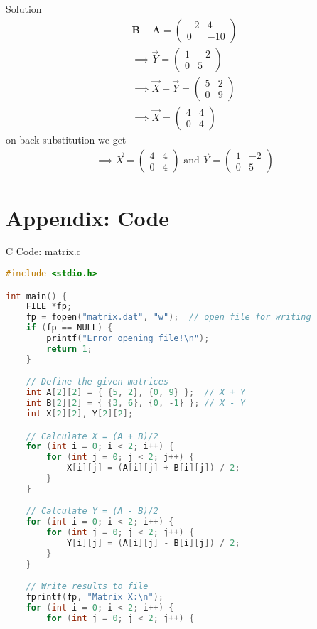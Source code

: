 \documentclass{beamer}
\numberwithin{equation}{section}
\theoremstyle{remark}
\let\vec\mathbf
\begin{document}
\begin{frame}{Solution}
    \begin{align}
\vec{B-A}= \begin{pmatrix}
    -2 & 4\\
    0 & -10
\end{pmatrix}\\
\implies \Vec{Y}=\begin{pmatrix} 1 & -2 \\ 0 & 5 \end{pmatrix}\\
\implies \Vec{X}+\Vec{Y}=\begin{pmatrix} 5 & 2 \\ 0 & 9 \end{pmatrix}\\
\implies \Vec{X}=\begin{pmatrix} 4 & 4 \\ 0 & 4 \end{pmatrix}
\end{align}
on back substitution we get
    \begin{align}
    \implies \Vec{X}=\begin{pmatrix}
    4 & 4\\
    0 & 4
\end{pmatrix} \text{ and } \Vec{Y}=\begin{pmatrix}
    1 & -2\\
    0 & 5
\end{pmatrix}
\end{align}
\end{frame}

\section*{Appendix: Code}

\begin{frame}[fragile]{C Code: matrix.c}
\begin{lstlisting}[language=C]
#include <stdio.h>

int main() {
    FILE *fp;
    fp = fopen("matrix.dat", "w");  // open file for writing
    if (fp == NULL) {
        printf("Error opening file!\n");
        return 1;
    }

    // Define the given matrices
    int A[2][2] = { {5, 2}, {0, 9} };  // X + Y
    int B[2][2] = { {3, 6}, {0, -1} }; // X - Y
    int X[2][2], Y[2][2];

    // Calculate X = (A + B)/2
    for (int i = 0; i < 2; i++) {
        for (int j = 0; j < 2; j++) {
            X[i][j] = (A[i][j] + B[i][j]) / 2;
        }
    }

    // Calculate Y = (A - B)/2
    for (int i = 0; i < 2; i++) {
        for (int j = 0; j < 2; j++) {
            Y[i][j] = (A[i][j] - B[i][j]) / 2;
        }
    }

    // Write results to file
    fprintf(fp, "Matrix X:\n");
    for (int i = 0; i < 2; i++) {
        for (int j = 0; j < 2; j++) {
           
\end{lstlisting}
\end{frame}
\end{document}
